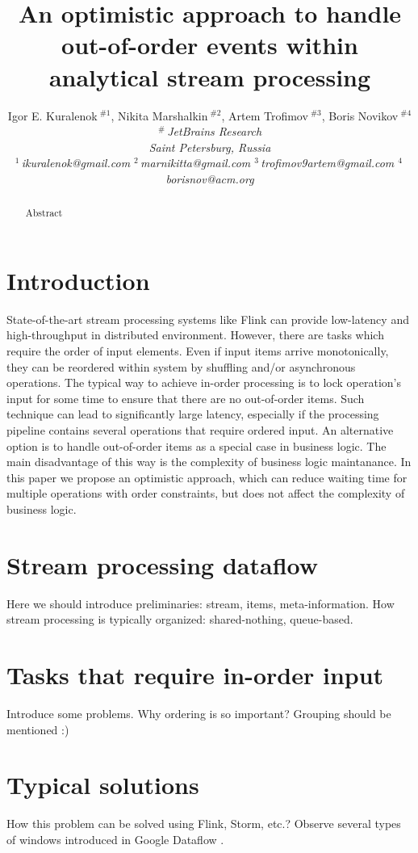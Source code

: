 \documentclass[10pt,conference,letterpaper]{IEEEtran}
\title{An optimistic approach to handle out-of-order events within analytical stream processing}
\author{%
{Igor E. Kuralenok{\small $~^{\#1}$}, 
    Nikita Marshalkin{\small $~^{\#2}$},
    Artem Trofimov{\small $~^{\#3}$}, 
        Boris Novikov{\small $~^{\#4}$} }%
\vspace{1.6mm}\\
\fontsize{10}{10}\selectfont\itshape
$^{\#}$\,JetBrains Research\\
Saint Petersburg, Russia\\
\fontsize{9}{9}\selectfont\ttfamily\upshape
%
$^1$\,ikuralenok@gmail.com   %
$^2$\,marnikitta@gmail.com    %
$^3$\,trofimov9artem@gmail.com   %
$^4$\,borisnov@acm.org 
}
\begin{document}
\maketitle
%
\begin{abstract} 
Abstract
\end{abstract}

%
\section {Introduction}
State-of-the-art stream processing systems like Flink \cite{carbone2015apache} can provide low-latency and high-throughput in distributed environment. However, there are tasks which require the order of input elements. Even if input items arrive monotonically, they can be reordered within system by shuffling and/or asynchronous operations. The typical way to achieve in-order processing is to lock operation's input for some time to ensure that there are no out-of-order items. Such technique can lead to significantly large latency, especially if  the processing pipeline contains several operations that require ordered input. An alternative option is to handle out-of-order items as a special case in business logic. The main disadvantage of this way is the complexity of business logic maintanance. In this paper we propose an optimistic approach, which can reduce waiting time for multiple operations with order constraints, but does not affect the complexity of business logic.

\section{Stream processing dataflow}
Here we should introduce preliminaries: stream, items, meta-information. How stream processing is typically organized: shared-nothing, queue-based.

\section{Tasks that require in-order input}
Introduce some problems. Why ordering is so important? Grouping should be mentioned :)

\section{Typical solutions}
How this problem can be solved using Flink, Storm, etc.? Observe several types of windows introduced in Google Dataflow \cite{Akidau:2015:DMP:2824032.2824076}.
\end{document}
